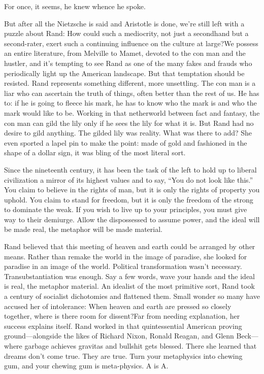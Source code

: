 For once, it seems, he knew whence he spoke.{\par} But after all the Nietzsche is said and Aristotle is done, we’re still left with a puzzle about Rand: How could such a mediocrity, not just a secondhand but a second-rater, exert such a continuing influence on the culture at large?We possess an entire literature, from Melville to Mamet, devoted to the con man and the hustler, and it’s tempting to see Rand as one of the many fakes and frauds who periodically light up the American landscape. But that temptation should be resisted. Rand represents something different, more unsettling. The con man is a liar who can ascertain the truth of things, often better than the rest of us. He has to: if he is going to fleece his mark, he has to know who the mark is and who the mark would like to be. Working in that netherworld between fact and fantasy, the con man can gild the lily only if he sees the lily for what it is. But Rand had no desire to gild anything. The gilded lily was reality. What was there to add? She even sported a lapel pin to make the point: made of gold and fashioned in the shape of a dollar sign, it was bling of the most literal sort.{\par} Since the nineteenth century, it has been the task of the left to hold up to liberal civilization a mirror of its highest values and to say, “You do not look like this.” You claim to believe in the rights of man, but it is only the rights of property you uphold. You claim to stand for freedom, but it is only the freedom of the strong to dominate the weak. If you wish to live up to your principles, you must give way to their demiurge. Allow the dispossessed to assume power, and the ideal will be made real, the metaphor will be made material.{\par} Rand believed that this meeting of heaven and earth could be arranged by other means. Rather than remake the world in the image of paradise, she looked for paradise in an image of the world. Political transformation wasn’t necessary. Transubstantiation was enough. Say a few words, wave your hands and the ideal is real, the metaphor material. An idealist of the most primitive sort, Rand took a century of socialist dichotomies and flattened them. Small wonder so many have accused her of intolerance: When heaven and earth are pressed so closely together, where is there room for dissent?Far from needing explanation, her success explains itself. Rand worked in that quintessential American proving ground—alongside the likes of Richard Nixon, Ronald Reagan, and Glenn Beck—where garbage achieves gravitas and bullshit gets blessed. There she learned that dreams don’t come true. They are true. Turn your metaphysics into chewing gum, and your chewing gum is meta-physics. A is A.{\par}